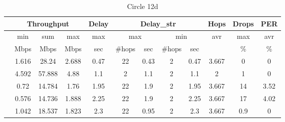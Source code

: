 \documentclass[11pt, a4paper]{article}
\newcommand{\algA}{\text{Main}}
\newcommand{\algB}{\text{Shortest}}
\newcommand{\algC}{\text{MainNoSched}}
\newcommand{\algD}{\text{MFNoSched}}
\newcommand{\algE}{\text{MFSched}}
\begin{document}
\begin{table}
\centering\small
\begin{tabular}{|| l || c | c | c | c|| c | c || c | c || c | c | c ||}
\hline
& \multicolumn{3}{|c|}{Throughput}  & Delay & \multicolumn{4}{|c||}{Delay\_str} & Hops & Drops & PER \\
\hline
& min & sum & max & max & \multicolumn{2}{|c||}{max} & \multicolumn{2}{|c||}{min} & avr & max & avr \\
\hline
& Mbps & Mbps & Mbps & sec & \#hops & sec & \#hops & sec & & \% & \% \\
\hline\hline
\algA & 1.616 & 28.24  & 2.688 & 0.47 & 22 & 0.43 & 2 & 0.47 & 3.667 & 0   & 0 \\
\algB & 4.592 & 57.888 & 4.88  & 1.1  & 2  & 1.1  & 2 & 1.1  & 2     & 1   & 0 \\
\algC & 0.72  & 14.784 & 1.76  & 1.95 & 22 & 1.9  & 2 & 1.95 & 3.667 & 14  & 3.52 \\
\algD & 0.576 & 14.736 & 1.888 & 2.25 & 22 & 1.9  & 2 & 2.25 & 3.667 & 17  & 4.02 \\
\algE & 1.042 & 18.537 & 1.823 & 2.3  & 22 & 0.95 & 2 & 2.3  & 3.667 & 0.9 & 0 \\
\hline
\end{tabular}
\caption{Circle 12d}
\label{table_mcs}
\end{table}
\end{document}
